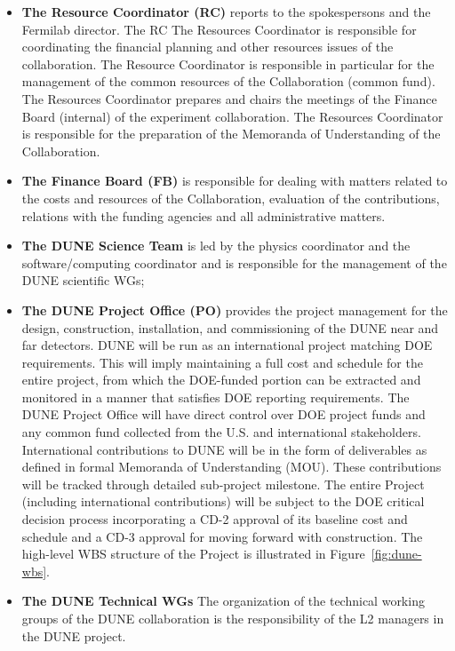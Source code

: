 \begin{itemize}
       \item \textbf{The Resource Coordinator (RC)} reports to the spokespersons and the Fermilab director. The RC
    The Resources Coordinator is responsible for coordinating the financial planning and other
resources issues of the collaboration. The Resource Coordinator is responsible in particular for
the management of the common resources of the Collaboration (common fund).
The Resources Coordinator prepares and chairs the meetings of the Finance Board (internal) of
the experiment collaboration. The Resources Coordinator is responsible for the
preparation of the Memoranda of Understanding of the Collaboration.
    \item \textbf{The Finance Board (FB)} is responsible for dealing with matters related to
the costs and resources of the Collaboration, evaluation of the contributions, relations with the
funding agencies and all administrative matters.  
    \item \textbf{The DUNE Science Team} is led by the physics coordinator and the software/computing coordinator and is responsible for the management of the DUNE scientific WGs;
    \item \textbf{The DUNE Project Office (PO)} provides the project management for the design, construction, installation, and commissioning of the DUNE near and far detectors. DUNE will be run as an international project matching DOE requirements. This will imply maintaining a full cost and schedule for the entire project, from which the DOE-funded portion can be extracted and monitored in a manner that satisfies DOE reporting requirements. The DUNE Project Office will have direct control over DOE project funds and any common fund collected from the U.S. and international stakeholders. International contributions to DUNE will be in the form of deliverables as defined in formal Memoranda of Understanding (MOU). These contributions will be tracked through detailed sub-project milestone. The entire Project (including international contributions) will be subject to the DOE critical decision process incorporating a CD-2 approval of its baseline cost and schedule and a CD-3 approval for moving forward with construction.  The high-level WBS structure of the Project is illustrated in Figure~\ref{fig:dune-wbs}.
    \item \textbf{The DUNE Technical WGs} The organization of the technical working groups of the DUNE collaboration is the responsibility of the L2 managers in the DUNE project.
\end{itemize}



